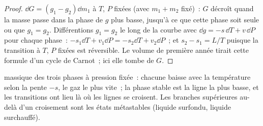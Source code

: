\begin{proof}
$\dd G = (g_1 - g_2)\dd m_1$ à $T$, $P$ fixées (avec $m_1 + m_2$ fixé)~:
$G$ décroît quand la masse passe dans la phase de $g$ plus basse, jusqu'à ce que cette
phase soit seule ou que $g_1 = g_2$. Différentions $g_1 = g_2$ le long de la
courbe avec $\dd g = -s\,\dd T + v\,\dd P$ pour chaque phase~: $-s_1\dd T +
v_1\dd P = -s_2\dd T + v_2\dd P$~; et $s_2 - s_1 = L/T$ puisque la transition
à $T$, $P$ fixées est réversible. Le volume de première année tirait cette formule
d'un cycle de Carnot~; ici elle tombe de $G$.
\end{proof}

\begin{omfigure}

{\small {} massique des trois phases à pression
fixée~: chacune baisse avec la température selon la pente $-s$, le gaz le
plus vite~; la phase stable est la ligne la plus basse, et les transitions ont lieu
là où les lignes se croisent. Les branches supérieures au-delà d'un croisement sont les
états métastables (liquide surfondu, liquide surchauffé).}
\end{omfigure}

